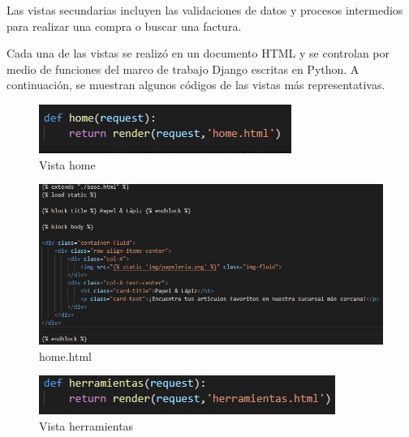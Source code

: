\documentclass[12pt,letterpaper]{article}
\begin{document}
	Las vistas secundarias incluyen las validaciones de datos y procesos intermedios para realizar una compra o buscar una factura.\par 
	
	Cada una de las vistas se realizó en un documento HTML y se controlan por medio de funciones del marco de trabajo Django escritas en Python. A continuación, se muestran algunos códigos de las vistas más representativas.
	
	\begin{figure}[H]
		\centering
		\includegraphics[scale=0.70]{Documentacion/img/def_home.PNG}
		\caption{Vista home}
	\end{figure}
	
	\begin{figure}[H]
		\centering
		\includegraphics[scale=0.70]{Documentacion/img/lineasHome.PNG}
		\caption{home.html}
	\end{figure}
	
	\begin{figure}[H]
		\centering
		\includegraphics[scale=0.70]{Documentacion/img/def_herramientas.PNG}
		\caption{Vista herramientas}
	\end{figure}
	
\end{document}
